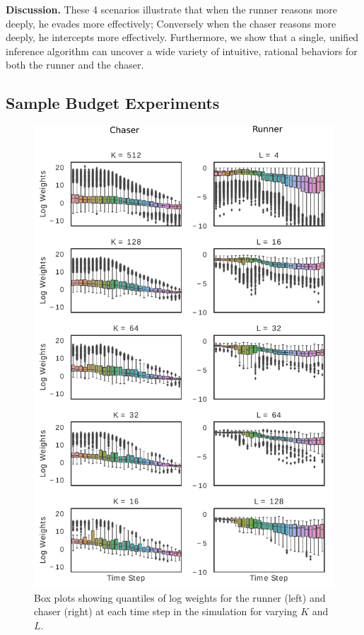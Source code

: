 \documentclass[twoside]{article}
\begin{document}
\textbf{Discussion.} These 4 scenarios illustrate that 
when the runner reasons more deeply, he evades more effectively; Conversely when the chaser reasons more deeply, he intercepts more effectively. Furthermore, we show that a single, unified inference algorithm can uncover a wide variety of intuitive, rational behaviors for both the runner and the chaser. %


\subsection{Sample Budget Experiments}
\vskip -0.05in

\begin{figure}[!t]
\begin{center}
\centerline{\hspace{-0.2em}\includegraphics[width=1.05\columnwidth]{PLOT_B_barplots.pdf}}
\caption{Box plots showing quantiles of log weights for the runner (left) and chaser (right) at each time step in the simulation for varying $K$ and $L$.}
\label{fig:box_plots}
\end{center}
\vskip -0.4in
\end{figure} 
\end{document}
